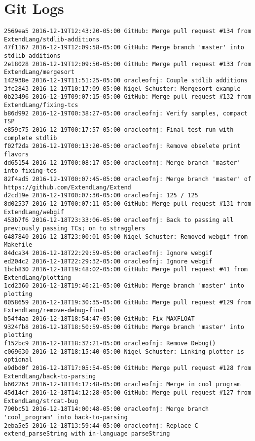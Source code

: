 \medskip \noindent
\chapter{Git Logs}
\begin{lstlisting}
2569ea5 2016-12-19T12:43:20-05:00 GitHub: Merge pull request #134 from ExtendLang/stdlib-additions
47f1167 2016-12-19T12:09:58-05:00 GitHub: Merge branch 'master' into stdlib-additions
2e18028 2016-12-19T12:09:50-05:00 GitHub: Merge pull request #133 from ExtendLang/mergesort
142938e 2016-12-19T11:51:25-05:00 oracleofnj: Couple stdlib additions
3fc2843 2016-12-19T10:17:09-05:00 Nigel Schuster: Mergesort example
0b23496 2016-12-19T09:07:15-05:00 GitHub: Merge pull request #132 from ExtendLang/fixing-tcs
b86d992 2016-12-19T00:38:27-05:00 oracleofnj: Verify samples, compact TSP
e859c75 2016-12-19T00:17:57-05:00 oracleofnj: Final test run with complete stdlib
f02f2da 2016-12-19T00:13:20-05:00 oracleofnj: Remove obselete print flavors
dd65154 2016-12-19T00:08:17-05:00 oracleofnj: Merge branch 'master' into fixing-tcs
82f4ad5 2016-12-19T00:07:45-05:00 oracleofnj: Merge branch 'master' of https://github.com/ExtendLang/Extend
d2cd19e 2016-12-19T00:07:30-05:00 oracleofnj: 125 / 125
8d02537 2016-12-19T00:07:11-05:00 GitHub: Merge pull request #131 from ExtendLang/webgif
453b7f6 2016-12-18T23:33:06-05:00 oracleofnj: Back to passing all previously passing TCs; on to stragglers
6487840 2016-12-18T23:00:01-05:00 Nigel Schuster: Removed webgif from Makefile
84dca34 2016-12-18T22:29:59-05:00 oracleofnj: Ignore webgif
ed204c2 2016-12-18T22:29:32-05:00 oracleofnj: Ignore webgif
1bcb830 2016-12-18T19:48:02-05:00 GitHub: Merge pull request #41 from ExtendLang/plotting
1cd2360 2016-12-18T19:46:21-05:00 GitHub: Merge branch 'master' into plotting
0058659 2016-12-18T19:30:35-05:00 GitHub: Merge pull request #129 from ExtendLang/remove-debug-final
b54f4aa 2016-12-18T18:54:47-05:00 GitHub: Fix MAXFLOAT
9324fb8 2016-12-18T18:50:59-05:00 GitHub: Merge branch 'master' into plotting
f152bc9 2016-12-18T18:32:21-05:00 oracleofnj: Remove Debug()
c069630 2016-12-18T18:15:40-05:00 Nigel Schuster: Linking plotter is optional
e9dbd0f 2016-12-18T17:05:54-05:00 GitHub: Merge pull request #128 from ExtendLang/back-to-parsing
b602263 2016-12-18T14:12:48-05:00 oracleofnj: Merge in cool program
45d14cf 2016-12-18T14:12:28-05:00 GitHub: Merge pull request #127 from ExtendLang/strcat-bug
790bc51 2016-12-18T14:00:48-05:00 oracleofnj: Merge branch 'cool_program' into back-to-parsing
2eba5e5 2016-12-18T13:59:44-05:00 oracleofnj: Replace C extend_parseString with in-language parseString

\end{lstlisting}
